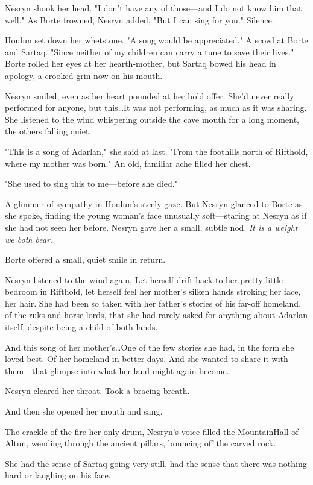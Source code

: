 Nesryn shook her head.
"I don't have any of those---and I do not know him that well."
As Borte frowned, Nesryn added, "But I can sing for you."
Silence.

Houlun set down her whetstone.
"A song would be appreciated."
A scowl at Borte and Sartaq.
"Since neither of my children can carry a tune to save their lives."
Borte rolled her eyes at her hearth-mother, but Sartaq bowed his head in apology, a crooked grin now on his mouth.

Nesryn smiled, even as her heart pounded at her bold offer.
She'd never really performed for anyone, but this\ldots It was not performing, as much as it was sharing.
She listened to the wind whispering outside the cave mouth for a long moment, the others falling quiet.

"This is a song of Adarlan," she said at last.
"From the foothills north of Rifthold, where my mother was born."
An old, familiar ache filled her chest.

"She used to sing this to me---before she died."

A glimmer of sympathy in Houlun's steely gaze.
But Nesryn glanced to Borte as she spoke, finding the young woman's face unusually soft---staring at Nesryn as if she had not seen her before.
Nesryn gave her a small, subtle nod.
\emph{It is a weight we both bear}.

Borte offered a small, quiet smile in return.

Nesryn listened to the wind again.
Let herself drift back to her pretty little bedroom in Rifthold, let herself feel her mother's silken hands stroking her face, her hair.
She had been so taken with her father's stories of his far-off homeland, of the ruks and horse-lords, that she had rarely asked for anything about Adarlan itself, despite being a child of both lands.

And this song of her mother's\ldots One of the few stories she had, in the form she loved best.
Of her homeland in better days.
And she wanted to share it with them---that glimpse into what her land might again become.

Nesryn cleared her throat.
Took a bracing breath.

And then she opened her mouth and sang.

The crackle of the fire her only drum, Nesryn's voice filled the MountainHall of Altun, wending through the ancient pillars, bouncing off the carved rock.

She had the sense of Sartaq going very still, had the sense that there was nothing hard or laughing on his face.

